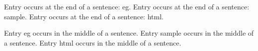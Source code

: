 \documentclass{article}
\begin{document}
Entry occurs at the end of a sentence: \gls{eg}.
Entry occurs at the end of a sentence: \gls{sample}.
Entry occurs at the end of a sentence: \gls{html}.

Entry \gls{eg} occurs in the middle of a sentence.
Entry \gls{sample} occurs in the middle of a sentence.
Entry \gls{html} occurs in the middle of a sentence.

\printglossaries
\end{document}
